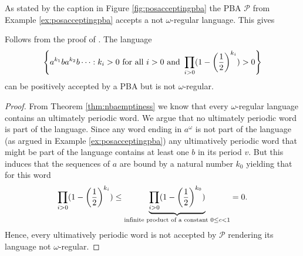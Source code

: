 As stated by the caption in Figure \ref{fig:posacceptingpba} the \ac{PBA}
$\mathcal{P}$ from Example \ref{ex:posacceptingpba} accepts a not
$\omega$-regular language. This gives
\begin{lemma}
  Follows from the proof of \cite[Theorem 4]{RecOmeLangProbAuto}.
  The language
  \begin{equation*}
    \left\{a^{k_{1}}ba^{k_{2}}b\dots:k_{i}>0\text{ for all }i>0\text{ and }
    \prod_{i>0}(1-\left(\frac{1}{2}\right)^{k_{i}}) > 0\right\}
  \end{equation*}
  can be positively accepted by a \ac{PBA} but is not $\omega$-regular.
  \label{lem:posaccpba>omegareg}
\end{lemma}
\begin{proof}
  From Theorem \ref{thm:nbaemptiness} we know that every $\omega$-regular 
  language contains an ultimately periodic word. We argue that no ultimately 
  periodic word is part of the language. Since any word ending in $a^{\omega}$ 
  is not part of the language (as argued in Example \ref{ex:posacceptingpba}) 
  any ultimatively periodic word that might be part of the language contains at 
  least one $b$ in its period $v$. But this induces that the sequences of $a$ 
  are bound by a natural number $k_{0}$ yielding that for this word
  \begin{equation*}
    \prod_{i>0}(1-\left(\frac{1}{2}\right)^{k_{i}}) \leq
    \underbrace{\prod_{i>0}(1-\left(\frac{1}{2}\right)^{k_{0}})}_{
      \text{infinite product of a constant }0\leq c<1} = 0.
  \end{equation*}
  Hence, every ultimatively periodic word is not accepted by $\mathcal{P}$
  rendering its language not $\omega$-regular.
\end{proof}

